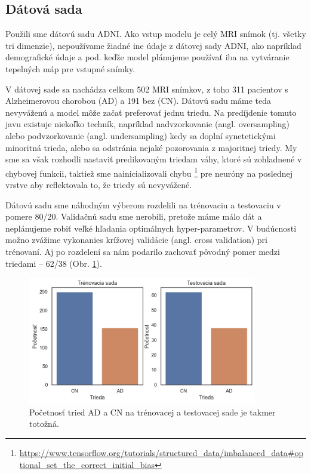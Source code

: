 \subsection{Dátová sada}

Použili sme dátovú sadu ADNI. Ako vstup modelu je celý MRI snímok (tj. všetky tri dimenzie), nepoužívame žiadné ine údaje z dátovej sady ADNI, ako napríklad demografické údaje a pod. keďže model plánujeme používať iba na vytváranie tepelných máp pre vstupné snímky. 

V dátovej sade sa nachádza celkom 502 MRI snímkov, z toho 311 pacientov s Alzheimerovou chorobou (AD) a 191 bez (CN). Dátovú sadu máme teda nevyváženú a model môže začať preferovať jednu triedu. Na predíjdenie tomuto javu existuje niekoľko techník, napríklad nadvzorkovanie (angl. oversampling) alebo podvzorkovanie (angl. undersampling) kedy sa doplní synetetickými minoritná trieda, alebo sa odstránia nejaké pozorovania z majoritnej triedy. My sme sa však rozhodli nastaviť predikovaným triedam váhy, ktoré sú zohladnené v chybovej funkcii, taktiež sme nainicializovali chybu \footnote{\url{https://www.tensorflow.org/tutorials/structured\_data/imbalanced\_data\#optional\_set\_the\_correct\_initial\_bias}} pre neuróny na poslednej vrstve aby reflektovala to, že triedy sú nevyvážené.

Dátovú sadu sme náhodným výberom rozdelili na trénovaciu a testovaciu v pomere 80/20. Validačnú sadu sme nerobili, pretože máme málo dát a neplánujeme robiť veľké hľadania optimálnych hyper-parametrov. V budúcnosti možno zvážime vykonanies krížovej validácie (angl. cross validation) pri trénovaní. Aj po rozdelení sa nám podarilo zachovať pôvodný pomer medzi triedami -- 62/38 (Obr. \ref{fig:dataset_classes}).

\begin{figure}[h!]
    \centering
    \includegraphics[width=10cm]{assets/images/dataset_classes.png}
    \caption{Početnosť tried AD a CN na trénovacej a testovacej sade je takmer totožná.}
    \label{fig:dataset_classes}
\end{figure}

